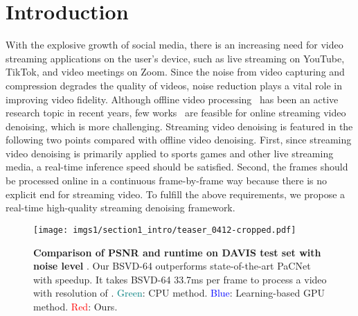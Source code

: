 \documentclass[sigconf]{acmart}
\begin{document}



\maketitle



\vspace{-5pt}
\section{Introduction}

With the explosive growth of social media, there is an increasing need for video streaming applications on the user's device, such as live streaming on YouTube, TikTok, and video meetings on Zoom. 
Since the noise from video capturing and compression degrades the quality of videos, noise reduction plays a vital role in improving video fidelity. 
Although offline video processing~\cite{Vaksman2021Patch,chan2021basicvsr,liang2022vrt,tassano2019dvdnet} has been an active research topic in recent years, few works~\cite{Tassano2020FastDVDNet,Maggioni2021Efficient,Wen2017Joint,Wen2019VIDOSAT} are feasible for online streaming video denoising, which is more challenging.
Streaming video denoising is featured in the following two points compared with offline video denoising.
First, since streaming video denoising is primarily applied to sports games and other live streaming media, a real-time inference speed should be satisfied.
Second, the frames should be processed online in a continuous frame-by-frame way because there is no explicit end for streaming video.
To fulfill the above requirements, we propose a real-time high-quality streaming denoising framework.


\begin{figure}[t]
\centering
\texttt{[image: imgs1/section1\_intro/teaser\_0412-cropped.pdf]}
\caption{\textbf{Comparison of PSNR and runtime on DAVIS test set with noise level }. Our BSVD-64 outperforms state-of-the-art PaCNet~\cite{Vaksman2021Patch} with  speedup. 
It takes BSVD-64 33.7ms per frame to process a video with resolution of .
\textcolor{teal}{Green}: CPU method. \textcolor{blue}{Blue}: Learning-based GPU method. \textcolor{red}{Red}: Ours.}
\label{fig:teaser}
\vspace{-1em}
\end{figure}
\end{document}
